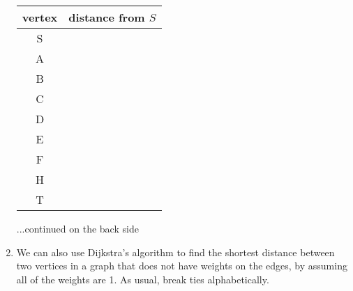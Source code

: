 \documentclass[12pt]{article}
\begin{document}
\begin{enumerate}
\begin{adjustbox}{valign=t,minipage={.25\textwidth}}
\end{adjustbox}


\vspace{1cm}

\begin{adjustbox}{valign=t,minipage={.5\textwidth}}
{
 \begin{tabular}{c | c}
vertex &  distance from $S$\\
\hline
S & \\ 
A & \\ 
B & \\
C & \\ D & \\ E & \\ F & \\ H & \\ T & \\
\end{tabular}
}
\end{adjustbox}

\vfill

\hfill{...continued on the back side}

\newpage

\item We can also use Dijkstra's algorithm to find the shortest distance between two vertices in a graph that does not have weights on the edges, by assuming all of the weights are 1. As usual, break ties alphabetically.

\begin{adjustbox}{valign=t,minipage={.4\textwidth}}
\end{adjustbox}
%
\begin{adjustbox}{valign=t,minipage={.25\textwidth}}


\end{adjustbox}
\end{enumerate}
\end{document}
